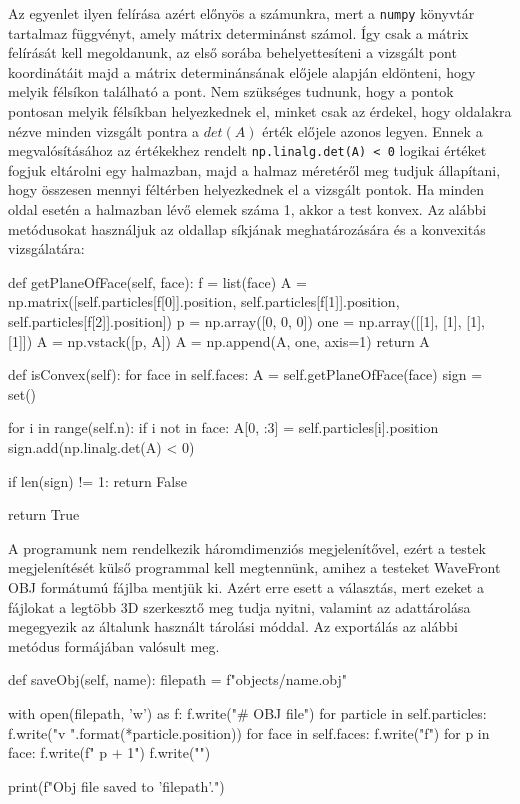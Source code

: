 Az egyenlet ilyen felírása azért előnyös a számunkra, mert a \texttt{numpy} könyvtár tartalmaz függvényt, amely mátrix determinánst számol.
Így csak a mátrix felírását kell megoldanunk, az első sorába behelyettesíteni a vizsgált pont koordinátáit majd a mátrix determinánsának előjele alapján eldönteni, hogy melyik félsíkon található a pont.
Nem szükséges tudnunk, hogy a pontok pontosan melyik félsíkban helyezkednek el, minket csak az érdekel, hogy oldalakra nézve minden vizsgált pontra a $det(A)$ érték előjele azonos legyen.
Ennek a megvalósításához az értékekhez rendelt \texttt{np.linalg.det(A) < 0} logikai értéket fogjuk eltárolni egy halmazban, majd a halmaz méretéről meg tudjuk állapítani, hogy összesen mennyi féltérben helyezkednek el a vizsgált pontok.
Ha minden oldal esetén a halmazban lévő elemek száma 1, akkor a test konvex.
Az alábbi metódusokat használjuk az oldallap síkjának meghatározására és a konvexitás vizsgálatára:

\begin{python}
def getPlaneOfFace(self, face):
    f = list(face)
    A = np.matrix([self.particles[f[0]].position,
                   self.particles[f[1]].position,
                   self.particles[f[2]].position])
    p = np.array([0, 0, 0])
    one = np.array([[1], [1], [1], [1]])
    A = np.vstack([p, A])
    A = np.append(A, one, axis=1)
    return A
    
def isConvex(self):
    for face in self.faces:
        A = self.getPlaneOfFace(face)
        sign = set()

        for i in range(self.n):
            if i not in face:
                A[0, :3] = self.particles[i].position
                sign.add(np.linalg.det(A) < 0)

        if len(sign) != 1:
            return False

    return True
\end{python}


A programunk nem rendelkezik háromdimenziós megjelenítővel, ezért a testek megjelenítését külső programmal kell megtennünk, amihez a testeket WaveFront OBJ \cite{wavefrontOBJ} formátumú fájlba mentjük ki.
Azért erre esett a választás, mert ezeket a fájlokat a legtöbb 3D szerkesztő meg tudja nyitni, valamint az adattárolása megegyezik az általunk használt tárolási móddal.
Az exportálás az alábbi metódus formájában valósult meg.

\newpage

\begin{python}
def saveObj(self, name):
    filepath = f"objects/{name}.obj"

    with open(filepath, 'w') as f:
        f.write("# OBJ file\n")
        for particle in self.particles:
            f.write("v {} {} {}\n".format(*particle.position))
        for face in self.faces:
            f.write("f")
            for p in face:
                f.write(f" {p + 1}")
            f.write("\n")

    print(f"Obj file saved to '{filepath}'.")
\end{python}

